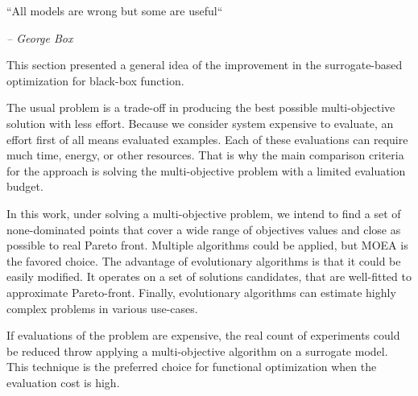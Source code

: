     \epigraph{``All models are wrong but some are useful``}{\textit{– George Box}}

    This section presented a general idea of the improvement in the surrogate-based optimization for black-box function. 


    The usual problem is a trade-off in producing the best possible multi-objective solution with less effort. Because we consider system expensive to evaluate, an effort first of all means evaluated examples. Each of these evaluations can require much time, energy, or other resources. That is why the main comparison criteria for the approach is solving the multi-objective problem with a limited evaluation budget. %

    In this work, under solving a multi-objective problem, we intend to find a set of none-dominated points that cover a wide range of objectives values and close as possible to real Pareto front. Multiple algorithms could be applied, but MOEA is the favored choice. The advantage of evolutionary algorithms is that it could be easily modified. It operates on a set of solutions candidates, that are well-fitted to approximate Pareto-front. Finally, evolutionary algorithms can estimate highly complex problems in various use-cases. 

    If evaluations of the problem are expensive, the real count of experiments could be reduced throw applying a multi-objective algorithm on a surrogate model. This technique is the preferred choice for functional optimization when the evaluation cost is high.

